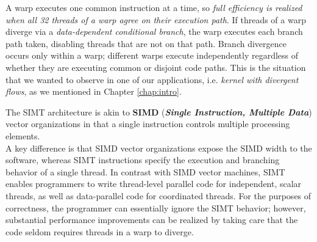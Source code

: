 	A warp executes one common instruction at a time, so \textit{full efficiency is realized when all 32 threads of a warp agree on their execution path}. If threads of a warp diverge via a \textit{data-dependent conditional branch}, the warp executes each branch path taken, disabling threads that are not on that path. Branch divergence occurs only within a warp; different warps execute independently regardless of whether they are executing common or disjoint code paths\cite{cudaguide}. This is the situation that we wanted to observe in one of our applications, i.e. \textit{kernel with divergent flows}, as we mentioned in Chapter \ref{chap:intro}.
	
	The SIMT architecture is akin to \textbf{SIMD} (\textbf{\textit{Single Instruction, Multiple Data}}) vector organizations in that a single instruction controls multiple processing elements.\\
	A key difference is that SIMD vector organizations expose the SIMD width to the software, whereas SIMT instructions specify the execution and branching behavior of a single thread. In contrast with SIMD vector machines, SIMT enables programmers to write thread-level parallel code for independent, scalar threads, as well as data-parallel code for coordinated threads. For the purposes of correctness, the programmer can essentially ignore the SIMT behavior; however, substantial performance improvements can be realized by taking care that the code seldom requires threads in a warp to diverge\cite{perfoptimize,understandlatency}. 
